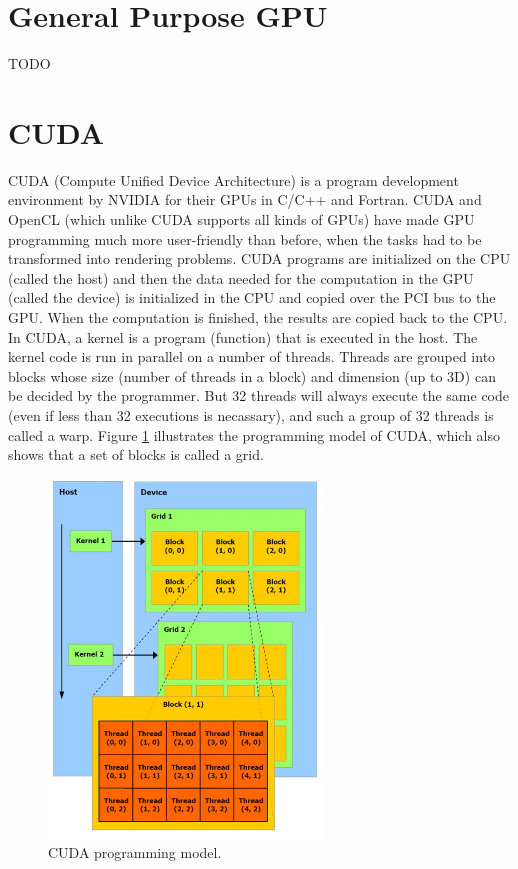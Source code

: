 \section{General Purpose GPU}
TODO 

\section{CUDA}
CUDA (Compute Uniﬁed Device Architecture) is a program development environment by NVIDIA for their GPUs in C/C++ and Fortran. CUDA and OpenCL (which unlike CUDA supports all kinds of GPUs) have made GPU programming much more user-friendly than before, when the tasks had to be transformed into rendering problems. CUDA programs are initialized on the CPU (called the host) and then the data needed for the computation in the GPU (called the device) is initialized in the CPU and copied over the PCI bus to the GPU. When the computation is finished, the results are copied back to the CPU. In CUDA, a kernel is a program (function) that is executed in the host. The kernel code is run in parallel on a number of threads. Threads are grouped into blocks whose size (number of threads in a block) and dimension (up to 3D) can be decided by the programmer. But 32 threads will always execute the same code (even if less than 32 executions is necassary), and such a group of 32 threads is called a warp. Figure \ref{CUDAProgModel} illustrates the programming model of CUDA, which also shows that a set of blocks is called a grid.

\begin{figure}[h!]
\centering
\includegraphics[width=0.65\textwidth]{parallel/CUDAProgModel}
\caption{CUDA programming model.}
\label{CUDAProgModel}
\end{figure} 

